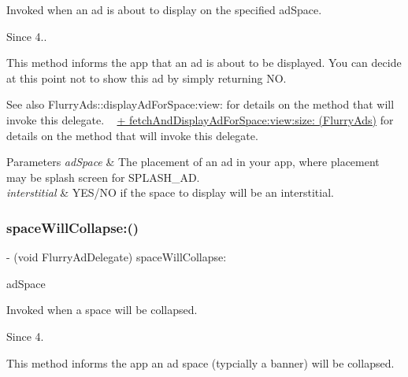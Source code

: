 Invoked when an ad is about to display on the specified {\ttfamily ad\+Space}. 

\begin{DoxySince}{Since}
4..
\end{DoxySince}
This method informs the app that an ad is about to be displayed. You can decide at this point not to show this ad by simply returning NO.

\begin{DoxySeeAlso}{See also}
Flurry\+Ads\+::display\+Ad\+For\+Space\+:view\+: for details on the method that will invoke this delegate. ~\newline
\hyperlink{interfaceFlurryAds_a6015497d507dc4c08a3b03b3717711ea}{+ fetch\+And\+Display\+Ad\+For\+Space\+:view\+:size\+: (\+Flurry\+Ads)} for details on the method that will invoke this delegate.
\end{DoxySeeAlso}

\begin{DoxyParams}{Parameters}
{\em ad\+Space} & The placement of an ad in your app, where placement may be splash screen for S\+P\+L\+A\+S\+H\+\_\+\+AD. \\
\hline
{\em interstitial} & Y\+E\+S/\+NO if the space to display will be an interstitial. \\
\hline
\end{DoxyParams}
\mbox{\label{protocolFlurryAdDelegate_01-p_a175999b6e0069b35919f24ab3e8f6c49}} 
\subsubsection{\texorpdfstring{space\+Will\+Collapse\+:()}{spaceWillCollapse:()}}
{\footnotesize\ttfamily -\/ (void Flurry\+Ad\+Delegate) space\+Will\+Collapse\+: \begin{DoxyParamCaption}\item[{(N\+S\+String $\ast$)}]{ad\+Space }\end{DoxyParamCaption}\hspace{0.3cm}{\ttfamily [optional]}}



Invoked when a space will be collapsed. 

\begin{DoxySince}{Since}
4.
\end{DoxySince}
This method informs the app an ad space (typcially a banner) will be collapsed.



